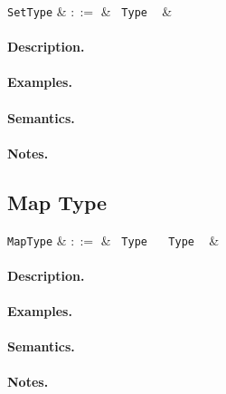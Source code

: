 \begin{syntax}
  \verb+SetType+ & $::=$ & \token{\{} \ \verb+Type+ \ \token{\}} &\\
\end{syntax}

\paragraph{Description.}

\paragraph{Examples.}

\paragraph{Semantics.}

\paragraph{Notes.} 


\subsection{Map Type}

\begin{syntax}
  \verb+MapType+ & $::=$ & \token{\{} \ \verb+Type+ \ \token{=>} \ \verb+Type+ \ \token{\}} &\\
\end{syntax}

\paragraph{Description.}

\paragraph{Examples.}

\paragraph{Semantics.}

\paragraph{Notes.} 

